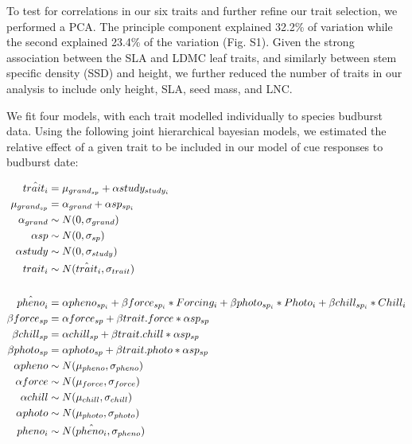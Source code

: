 \documentclass{article}\usepackage[]{graphicx}\usepackage[]{color}
\begin{document}
To test for correlations in our six traits and further refine our trait selection, we performed a PCA. The principle component explained 32.2\% of variation while the second explained 23.4\% of the variation (Fig. S1). Given the strong association between the SLA and LDMC leaf traits, and similarly between stem specific density (SSD) and height, we further reduced the number of traits in our analysis to include only height, SLA, seed mass, and LNC. 

We fit four models, with each trait modelled individually to species budburst data. Using the following joint hierarchical bayesian models, we estimated the relative effect of a given trait to be included in our model of cue responses to budburst date: %

\begin{align*}
\hat{trait_i} &= \mu_{grand_{sp}} + \alpha study_{study_i} \\
\mu_{grand_{sp}} &= \alpha_{grand} + \alpha sp_{sp_i} \\
\alpha_{grand}  & \sim N(0, \sigma_{grand})\\
\alpha sp & \sim N(0, \sigma_{sp}) \\
\alpha study& \sim N(0, \sigma_{study}) \\
trait_i & \sim N(\hat{trait}_i, \sigma_{trait}) \\
\vspace{1ex}\\
\hat{pheno}_i  &= \alpha pheno_{sp_i} + \beta force_{sp_i} * Forcing_{i} + \beta photo_{sp_i}  * Photo_{i} + \beta chill_{sp_i} * Chill_{i} \\
\beta force_{sp} &= \alpha force_{sp} + \beta trait.force * \alpha sp_{sp}\\
\beta chill_{sp} &= \alpha chill_{sp} + \beta trait.chill * \alpha sp_{sp}\\
\beta photo_{sp} &= \alpha photo_{sp} + \beta trait.photo * \alpha sp_{sp}\\
\alpha pheno & \sim N(\mu_{pheno}, \sigma_{pheno}) \\
\alpha force& \sim N(\mu_{force}, \sigma_{force}) \\
\alpha chill & \sim N(\mu_{chill}, \sigma_{chill}) \\
\alpha photo & \sim N(\mu_{photo}, \sigma_{photo}) \\
pheno_{i} & \sim N(\hat{pheno_i}, \sigma_{pheno}) \\
\end{align*}
\end{document}
